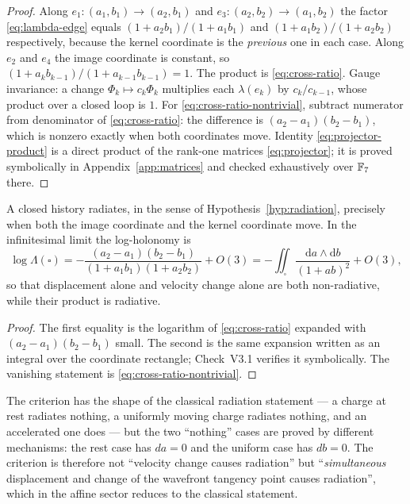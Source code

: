 \begin{proof}
Along $e_1:(a_1,b_1)\to(a_2,b_1)$ and $e_3:(a_2,b_2)\to(a_1,b_2)$ the factor
\eqref{eq:lambda-edge} equals $(1+a_2b_1)/(1+a_1b_1)$ and
$(1+a_1b_2)/(1+a_2b_2)$ respectively, because the kernel coordinate is the
\emph{previous} one in each case.  Along $e_2$ and $e_4$ the image coordinate is
constant, so $(1+a_kb_{k-1})/(1+a_{k-1}b_{k-1})=1$.  The product is
\eqref{eq:cross-ratio}.  Gauge invariance: a change $\Phi_k\mapsto c_k\Phi_k$
multiplies each $\lambda(e_k)$ by $c_k/c_{k-1}$, whose product over a closed loop
is $1$.  For \eqref{eq:cross-ratio-nontrivial}, subtract numerator from
denominator of \eqref{eq:cross-ratio}: the difference is
$(a_2-a_1)(b_2-b_1)$, which is nonzero exactly when both coordinates move.
Identity \eqref{eq:projector-product} is a direct product of the rank-one
matrices \eqref{eq:projector}; it is proved symbolically in
Appendix~\ref{app:matrices} and checked exhaustively over $\mathbb{F}_7$ there.
\end{proof}

\begin{corollary}
\label{cor:larmor}
A closed history radiates, in the sense of Hypothesis~\ref{hyp:radiation},
precisely when both the image coordinate and the kernel coordinate move.  In the
infinitesimal limit the log-holonomy is
\begin{equation}\label{eq:larmor}
  \log\Lambda(\square)
  =-\frac{(a_2-a_1)(b_2-b_1)}{(1+a_1b_1)(1+a_2b_2)}+O(3)
  =-\iint_{\square}\frac{\mathrm da\wedge\mathrm db}{(1+ab)^{2}}+O(3),
\end{equation}
so that displacement alone and velocity change alone are both non-radiative,
while their product is radiative.
\end{corollary}

\begin{proof}
The first equality is the logarithm of \eqref{eq:cross-ratio} expanded with
$(a_2-a_1)(b_2-b_1)$ small.  The second is the same expansion written as an
integral over the coordinate rectangle; Check~V3.1 verifies it symbolically.
The vanishing statement is \eqref{eq:cross-ratio-nontrivial}.
\end{proof}

\begin{remark}
\label{rem:larmor-structure}
The criterion has the shape of the classical radiation statement --- a charge at
rest radiates nothing, a uniformly moving charge radiates nothing, and an
accelerated one does --- but the two ``nothing'' cases are proved by different
mechanisms: the rest case has $da=0$ and the uniform case has $db=0$.  The
criterion is therefore not ``velocity change causes radiation'' but
``\emph{simultaneous} displacement and change of the wavefront tangency point
causes radiation'', which in the affine sector reduces to the classical
statement.
\end{remark}


